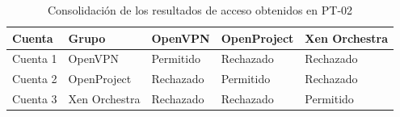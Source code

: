 \begin{table}[htbp]
	\centering
	\fontsize{8.5pt}{9.5pt}\selectfont
	\renewcommand{\arraystretch}{1.3}
	\setlength{\tabcolsep}{4pt}
	\caption{Consolidación de los resultados de acceso obtenidos en PT-02}
	\label{tab:pt02-consolidacion-resultados}
	\begin{tabular}{|
		>{\raggedright\arraybackslash}p{2.5cm}|
		>{\raggedright\arraybackslash}p{3.0cm}|
		>{\raggedright\arraybackslash}p{2.5cm}|
		>{\raggedright\arraybackslash}p{2.5cm}|
		>{\raggedright\arraybackslash}p{3.0cm}|}
		\hline
		\tableheader
		\textbf{Cuenta}      &
		\textbf{Grupo}       &
		\textbf{OpenVPN}     &
		\textbf{OpenProject} &
		\textbf{Xen Orchestra}
		\\
		\hline
		Cuenta 1             & OpenVPN       & Permitido & Rechazado & Rechazado \\ \hline
		Cuenta 2             & OpenProject   & Rechazado & Permitido & Rechazado \\ \hline
		Cuenta 3             & Xen Orchestra & Rechazado & Rechazado & Permitido \\ \hline
	\end{tabular}
\end{table}
\normalsize

